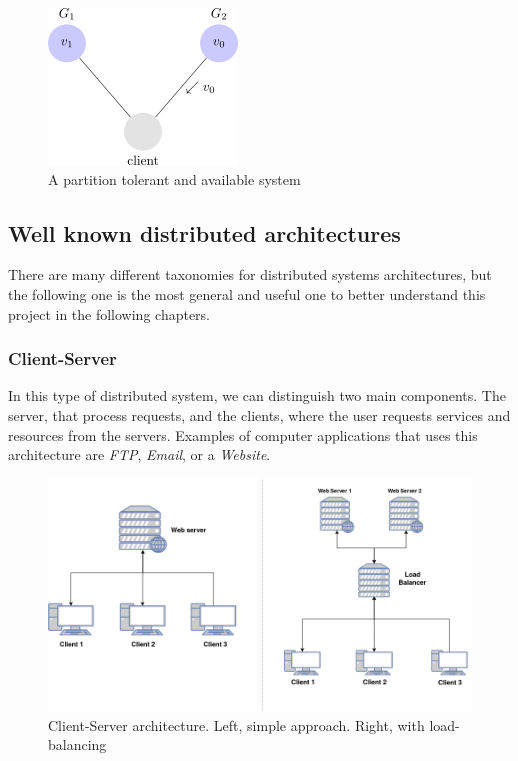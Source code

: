 \begin{figure}[h!]
    \includegraphics[scale=0.6]{assets/images/cap26.png}
    \caption{A partition tolerant and available system}
    \label{fig:non-cap-system}
\end{figure}

\subsection{Well known distributed architectures}
There are many different taxonomies for distributed systems architectures, but the following one is the most general and useful one to better understand this project in the following chapters.

\subsubsection*{Client-Server}
In this type of distributed system, we can distinguish two main components. The server, that process requests, and the clients, where the user requests services and resources from the servers. Examples of computer applications that uses this architecture are \textit{FTP}, \textit{Email}, or a \textit{Website}.

\begin{figure}[h!]
\centering
    \includegraphics[width=\linewidth]{assets/images/client-server.png}
    \caption{Client-Server architecture. Left, simple approach. Right, with load-balancing}
    \label{fig:client-server}
\end{figure}

